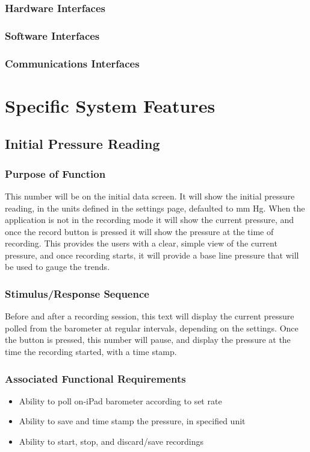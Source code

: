 \documentclass[onecolumn, draftclsnofoot,10pt, compsoc]{IEEEtran}
\begin{document}
\subsubsection{Hardware Interfaces}

\subsubsection{Software Interfaces}

\subsubsection{Communications Interfaces}

\section{Specific System Features}

\subsection{Initial Pressure Reading}

\subsubsection{Purpose of Function}
This number will be on the initial data screen.
It will show the initial pressure reading, in the units defined in the settings page, defaulted to mm Hg.
When the application is not in the recording mode it will show the current pressure, and once the record button is pressed it will show the pressure at the time of recording.
This provides the users with a clear, simple view of the current pressure, and once recording starts, it will provide a base line pressure that will be used to gauge the trends.
\subsubsection{Stimulus/Response Sequence}
Before and after a recording session, this text will display the current pressure polled from the barometer at regular intervals, depending on the settings.
Once the button is pressed, this number will pause, and display the pressure at the time the recording started, with a time stamp.

\subsubsection{Associated Functional Requirements}
\begin{itemize}
\item Ability to poll on-iPad barometer according to set rate
\item Ability to save and time stamp the pressure, in specified unit
\item Ability to start, stop, and discard/save recordings
\end{itemize}
\end{document}
